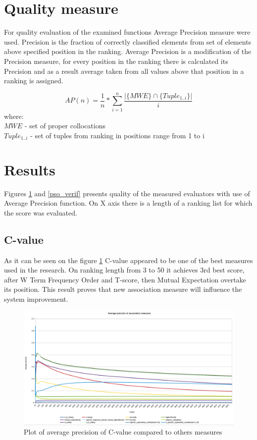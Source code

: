\section{Quality measure}\label{ap_desc}
For quality evaluation of the examined functions Average Precision measure were used.
Precision is the fraction of correctly classified elements from set of elements above specified position in the ranking. 
Average Precision is a modification of the Precision measure, for every position in the ranking there is calculated its 
Precision and as a result average taken from all values above that position in a ranking is assigned.

\[
    AP(n) = \frac{1}{n} * \sum_{i=1}^{n}{\frac{|\{MWE\} \cap \{Tuple_{1..i}\}|}{i}}
\]
where: \\
\(MWE\) - set of proper collocations \\
\(Tuple_{1..i}\) - set of tuples from ranking in positions range from 1 to i

\section{Results}
Figures \ref{cval_verif} and \ref{pso_verif} presents quality of the measured evaluators with use of Average Precision function. 
On X axis there is a length of a ranking list for which the score was evaluated.
\subsection{C-value}
As it can be seen on the figure \ref{cval_verif} C-value appeared to be one of the best measures used in the research. 
On ranking length from 3 to 50 it achieves 3rd best score, after W Term Frequency Order and T-score, then Mutual Expectation 
overtake its position. This result proves that new association measure will influence the system improvement.
\begin{figure}[ht]
    \centering
    \includegraphics[scale=0.32]{img/cval_verif.png}
    \caption{Plot of average precision of C-value compared to others measures}
    \label{cval_verif}
\end{figure}

